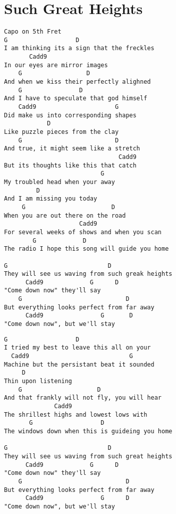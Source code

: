 \documentclass[leqno]{memoir}
\begin{document}
\chapter{Such Great Heights}
\begin{verbatim}
Capo on 5th Fret
G                   D
I am thinking its a sign that the freckles
       Cadd9
In our eyes are mirror images
    G                  D
And when we kiss their perfectly alighned
    G                D
And I have to speculate that god himself
    Cadd9                      G
Did make us into corresponding shapes
            D
Like puzzle pieces from the clay
    G                          D
And true, it might seem like a stretch
                                Cadd9
But its thoughts like this that catch
                           G
My troubled head when your away
         D
And I am missing you today
     G                        D
When you are out there on the road
                     Cadd9
For several weeks of shows and when you scan
        G             D
The radio I hope this song will guide you home

G                            D
They will see us waving from such greak heights
      Cadd9             G      D
"Come down now" they'll say
    G                             D
But everything looks perfect from far away
      Cadd9                G       D
"Come down now", but we'll stay
\end{verbatim}
\newpage
\begin{verbatim}
G                   D
I tried my best to leave this all on your
  Cadd9                            G
Machine but the persistant beat it sounded
     D
Thin upon listening
    G                     D
And that frankly will not fly, you will hear
              Cadd9
The shrillest highs and lowest lows with
       G                   D
The windows down when this is guideing you home

G                            D
They will see us waving from such great heights
      Cadd9             G      D
"Come down now" they'll say
    G                             D
But everything looks perfect from far away
      Cadd9                G      D
"Come down now", but we'll stay
\end{verbatim}
\newpage
\end{document}
